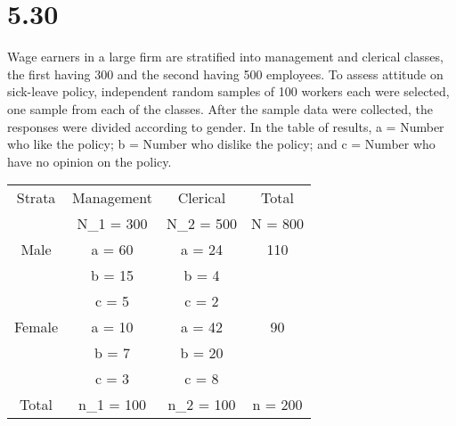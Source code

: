 \documentclass{article}
\begin{document}
\medskip
\section{5.30}
Wage earners in a large firm are stratified into management and clerical classes, the first having 300 and the second having 500 employees. To assess attitude on sick-leave policy, independent random samples of 100 workers each were selected, one sample from each of the classes. After the sample data were collected, the responses were divided according to gender. In the table of results, a = Number who like the policy; b = Number who dislike the policy; and c = Number who have no opinion on the policy. 

\medskip

\begin{center}
\begin{tabular}{|c|c|c|c|}
    \hline
    Strata & Management & Clerical & Total \\
     & N_1 = 300 & N_2 = 500 & N = 800 \\
     \hline
     Male & a = 60 & a = 24 & 110 \\
      & b = 15 & b = 4 & \\
      & c = 5 & c = 2 & \\
     \hline
     Female & a = 10 & a = 42 & 90 \\
      & b = 7 & b = 20 & \\
      & c = 3 & c = 8 & \\
     \hline
     Total & n_1 = 100 & n_2 = 100 & n = 200 \\
     \hline
\end{tabular}
\end{center}
\end{document}
